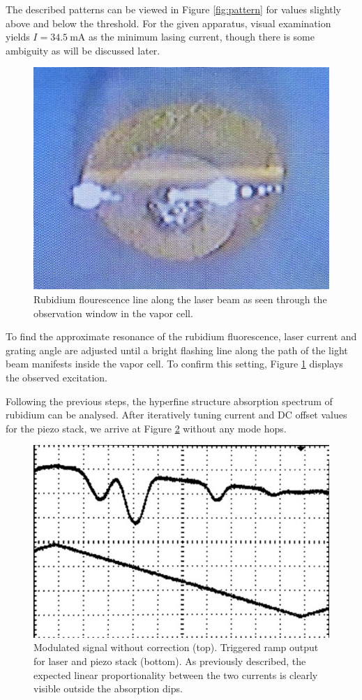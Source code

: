The described patterns can be viewed in Figure \ref{fig:pattern} for values slightly above and below the threshold. For the given
apparatus, visual examination yields $I = \qty{34.5}{\milli\ampere}$ as the minimum lasing current, though there is some ambiguity
as will be discussed later.

\begin{figure}[H]
    \centering
    \includegraphics[width=0.48\linewidth]{content/measurement/fluorescence.jpg}
    \captionsetup{width=0.7\linewidth}
    \caption{Rubidium flourescence line along the laser beam as seen through the observation window in the vapor cell.}
    \label{fig:fluorescence}
\end{figure}

To find the approximate resonance of the rubidium fluorescence, laser current and grating angle are adjusted until a bright flashing
line along the path of the light beam manifests inside the vapor cell. To confirm this setting, Figure \ref{fig:fluorescence} displays
the observed excitation.

Following the previous steps, the hyperfine structure absorption spectrum of rubidium can be analysed. After iteratively tuning current
and DC offset values for the piezo stack, we arrive at Figure \ref{fig:ramp} without any mode hops.

\begin{figure}[H]
    \centering
    \includegraphics[width=0.72\linewidth]{content/measurement/ramp.jpg}
    \captionsetup{width=0.8\linewidth}
    \caption{Modulated signal without correction (top). Triggered ramp output for laser and piezo stack (bottom).
             As previously described, the expected linear proportionality between the two currents is clearly visible
             outside the absorption dips.}
    \label{fig:ramp}
\end{figure}

